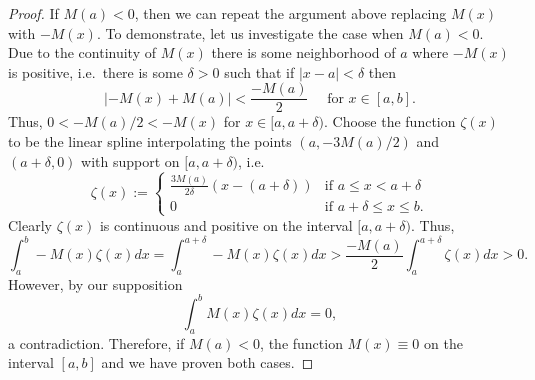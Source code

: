 \begin{proof}
  If $M(a) < 0$, then we can repeat the argument above replacing $M(x)$ with $-M(x)$.
  To demonstrate, let us investigate the case when $M(a) < 0$. Due to
  the continuity of $M(x)$ there is some neighborhood of $a$ where $-M(x)$
  is positive, i.e.\ there is some $\delta > 0$ such that if $|x - a| < \delta$
  then
  $$|-M(x) + M(a)| < \frac{-M(a)}{2} \quad \text{ for $x \in [a,b]$}.$$
  Thus, $0 < -M(a)/2 < -M(x)$ for $x \in [a,a+\delta)$.
  Choose the function $\zeta(x)$ to be the linear spline interpolating
  the points $(a, -3M(a)/2)$ and $(a + \delta, 0)$ with support on $[a, a + \delta)$,
  i.e.\
  \[
    \zeta(x) :=
    \begin{cases}
      \frac{3M(a)}{2\delta}(x - (a+\delta)) & \text{if $a \leq x < a + \delta$}\\
      0 & \text{if $a + \delta \leq x \leq b$}.
    \end{cases}
  \]
  Clearly $\zeta(x)$ is continuous and positive on the interval $[a, a + \delta)$.
  Thus,
  \[
    \int_a^b -M(x) \zeta(x) dx = \int_a^{a+\delta} -M(x) \zeta(x) dx > \frac{-M(a)}{2} \int_a^{a+\delta}  \zeta(x) dx > 0.
  \]
  However, by our supposition
  \[
    \int_a^b M(x) \zeta(x) dx = 0,
  \]
  a contradiction. Therefore, if $M(a) < 0$, the function $M(x) \equiv 0$ on
  the interval $[a, b]$ and we have proven both cases.
\end{proof}
